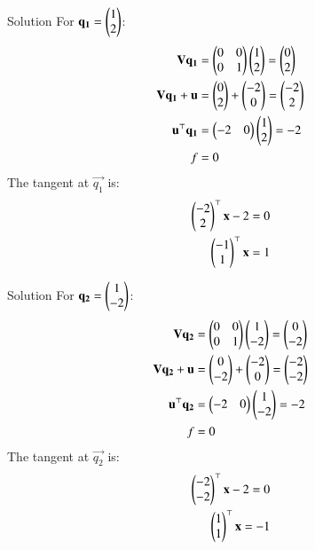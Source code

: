 \documentclass{beamer}
\begin{document}
\begin{frame}{Solution}
For $\mathbf{q_1} = \begin{pmatrix}1 \\ 2\end{pmatrix}$:
\begin{align}
\mathbf{V}\mathbf{q_1} &= \begin{pmatrix}0 & 0 \\ 0 & 1\end{pmatrix}\begin{pmatrix}1 \\ 2\end{pmatrix} = \begin{pmatrix}0\\ 2\end{pmatrix} \\
\mathbf{V}\mathbf{q_1} + \mathbf{u} &= \begin{pmatrix}0 \\ 2\end{pmatrix} + \begin{pmatrix}-2 \\ 0\end{pmatrix} = \begin{pmatrix}-2 \\ 2\end{pmatrix} \\
\mathbf{u}^{\top}\mathbf{q_1} &= \begin{pmatrix}-2 & 0\end{pmatrix}\begin{pmatrix}1 \\ 2\end{pmatrix} = -2 \\
f &= 0
\end{align}
The tangent at $\vec{q_1}$ is:
\begin{align}
    \begin{pmatrix}-2 \\ 2\end{pmatrix}^\top\mathbf{x} - 2 = 0\\
    \begin{pmatrix}-1 \\ 1\end{pmatrix}^\top\mathbf{x}=1\label{eq:tangent1}
    \end{align}
\end{frame}

\begin{frame}{Solution}
For $\mathbf{q_2} = \begin{pmatrix}1 \\ -2\end{pmatrix}$:
\begin{align}
\mathbf{V}\mathbf{q_2} &= \begin{pmatrix}0 & 0 \\ 0 & 1\end{pmatrix}\begin{pmatrix}1 \\ -2\end{pmatrix} = \begin{pmatrix}0 \\ -2\end{pmatrix} \\
\mathbf{V}\mathbf{q_2} + \mathbf{u} &= \begin{pmatrix}0 \\ -2\end{pmatrix} + \begin{pmatrix}-2 \\ 0\end{pmatrix} = \begin{pmatrix}-2 \\ -2\end{pmatrix} \\
\mathbf{u}^{\top}\mathbf{q_2} &= \begin{pmatrix}-2 & 0\end{pmatrix}\begin{pmatrix}1 \\ -2\end{pmatrix} = -2 \\
f &= 0
\end{align}
The tangent at $\vec{q_2}$ is:
\begin{align}
    \begin{pmatrix}-2 \\ -2\end{pmatrix}^\top\mathbf{x} - 2 = 0\\
    \begin{pmatrix}1 \\ 1\end{pmatrix}^\top\mathbf{x}=-1\label{eq:tangent2}
    \end{align}
\end{frame}
\end{document}
